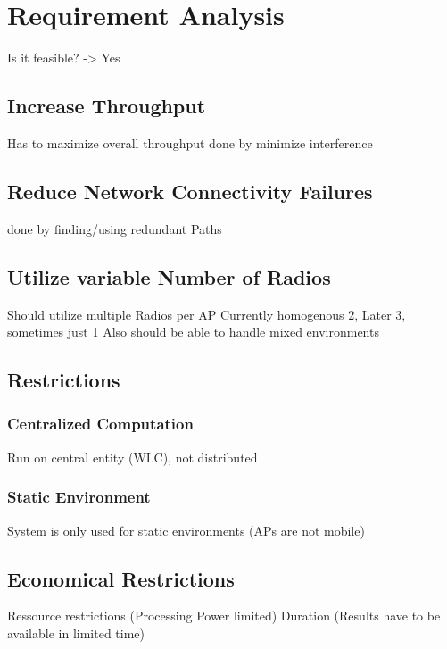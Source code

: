 \chapter{Requirement Analysis}
Is it feasible? -> Yes
\section{Increase Throughput}
  Has to maximize overall throughput\newline
    done by minimize interference\newline
\section{Reduce Network Connectivity Failures}
  done by finding/using redundant Paths\newline
\section{Utilize variable Number of Radios}
  Should utilize multiple Radios per AP\newline
  Currently homogenous 2, Later 3, sometimes just 1 \newline
  Also should be able to handle mixed environments \newline
\section{Restrictions}
  \subsection{Centralized Computation}
    Run on central entity (WLC), not distributed \newline 
  \subsection{Static Environment}
    System is only used for static environments (APs are not mobile) \newline
\section{Economical Restrictions}
  Ressource restrictions (Processing Power limited) \newline
  Duration (Results have to be available in limited time) \newline
